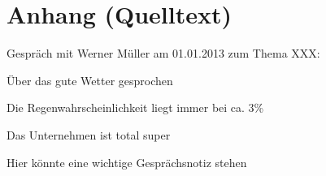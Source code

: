\section*{Anhang (Quelltext)}

\anhangsverzeichnis



Gespräch mit Werner Müller am 01.01.2013 zum Thema XXX:
\begin{compactitem}
	\item Über das gute Wetter gesprochen
	\item Die Regenwahrscheinlichkeit liegt immer bei ca. 3\%
	\item Das Unternehmen ist total super
	\item Hier könnte eine wichtige Gesprächsnotiz stehen
\end{compactitem}
